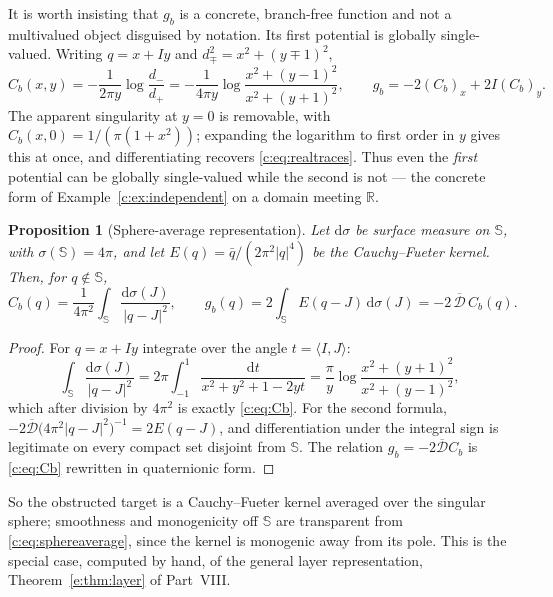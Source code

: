 \documentclass[11pt,a4paper]{article}
\numberwithin{equation}{section}
\newtheorem{proposition}[theorem]{Proposition}
\theoremstyle{definition}
\theoremstyle{remark}
\theoremstyle{plain}
\newcommand{\RR}{\mathbb R}
\newcommand{\SSS}{\mathbb S}
\newcommand{\Dop}{\mathcal D}
\newcommand{\pot}{C}          %
\newcommand{\abs}[1]{\lvert #1\rvert}
\newcommand{\dd}{\mathrm d}
\begin{document}
It is worth insisting that $g_b$ is a concrete, branch-free function and
not a multivalued object disguised by notation.  Its first potential is
globally single-valued.  Writing $q=x+Iy$ and
$d_\mp^2=x^2+(y\mp1)^2$,
\begin{equation}
  \pot_b(x,y)=-\frac1{2\pi y}\log\frac{d_-}{d_+}
   =-\frac{1}{4\pi y}\log\frac{x^{2}+(y-1)^{2}}{x^{2}+(y+1)^{2}},
  \qquad g_b=-2(\pot_b)_x+2I(\pot_b)_y .
  \label{c:eq:Cb}
\end{equation}
The apparent singularity at $y=0$ is removable, with
$\pot_b(x,0)=1/(\pi(1+x^2))$; expanding the logarithm to first order in
$y$ gives this at once, and differentiating recovers
\eqref{c:eq:realtraces}.  Thus even the \emph{first} potential can be
globally single-valued while the second is not — the concrete form of
Example~\ref{c:ex:independent} on a domain meeting $\RR$.

\begin{proposition}[Sphere-average representation]
\label{c:prop:sphereaverage}
Let $\dd\sigma$ be surface measure on $\SSS$, with $\sigma(\SSS)=4\pi$,
and let $E(q)=\bar q/(2\pi^{2}\abs q^{4})$ be the Cauchy--Fueter kernel.
Then, for $q\notin\SSS$,
\begin{equation}
  \pot_b(q)=\frac1{4\pi^{2}}\int_{\SSS}\frac{\dd\sigma(J)}{\abs{q-J}^{2}},
  \qquad
  g_b(q)=2\int_{\SSS}E(q-J)\,\dd\sigma(J)
       =-2\,\overline{\Dop}\,\pot_b(q).
  \label{c:eq:sphereaverage}
\end{equation}
\end{proposition}

\begin{proof}
For $q=x+Iy$ integrate over the angle $t=\langle I,J\rangle$:
\[
  \int_{\SSS}\frac{\dd\sigma(J)}{\abs{q-J}^{2}}
  =2\pi\int_{-1}^{1}\frac{\dd t}{x^{2}+y^{2}+1-2yt}
  =\frac{\pi}{y}\log\frac{x^{2}+(y+1)^{2}}{x^{2}+(y-1)^{2}},
\]
which after division by $4\pi^2$ is exactly \eqref{c:eq:Cb}.  For the
second formula, $-2\overline{\Dop}\bigl(4\pi^{2}\abs{q-J}^{2}\bigr)^{-1}
=2E(q-J)$, and differentiation under the integral sign is legitimate on
every compact set disjoint from $\SSS$.  The relation
$g_b=-2\overline{\Dop}\pot_b$ is \eqref{c:eq:Cb} rewritten in
quaternionic form.
\end{proof}

So the obstructed target is a Cauchy--Fueter kernel averaged over the
singular sphere; smoothness and monogenicity off $\SSS$ are transparent
from \eqref{c:eq:sphereaverage}, since the kernel is monogenic away from
its pole.  This is the special case, computed by hand, of the general layer representation, Theorem~\ref{e:thm:layer} of Part~VIII.
\end{document}
